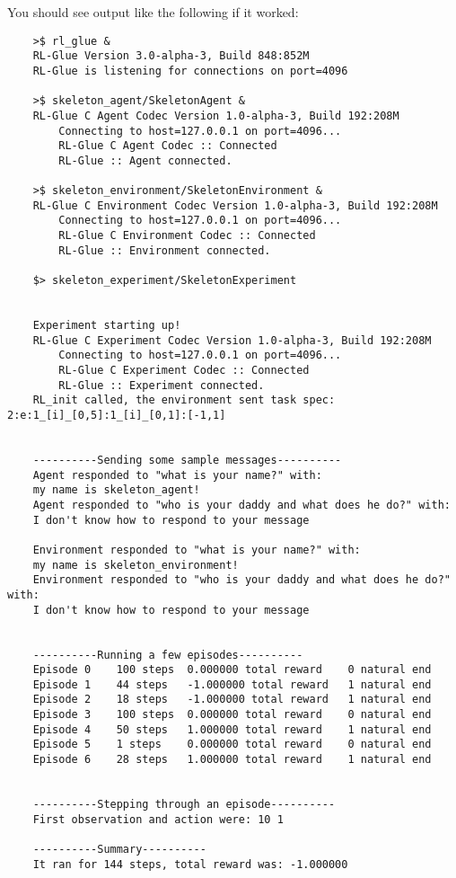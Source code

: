\documentclass[11pt]{article}
\begin{document}
You should see output like the following if it worked:
\begin{verbatim}
	>$ rl_glue &
	RL-Glue Version 3.0-alpha-3, Build 848:852M
	RL-Glue is listening for connections on port=4096

	>$ skeleton_agent/SkeletonAgent & 
	RL-Glue C Agent Codec Version 1.0-alpha-3, Build 192:208M
		Connecting to host=127.0.0.1 on port=4096...
		RL-Glue C Agent Codec :: Connected
		RL-Glue :: Agent connected.

	>$ skeleton_environment/SkeletonEnvironment & 
	RL-Glue C Environment Codec Version 1.0-alpha-3, Build 192:208M
		Connecting to host=127.0.0.1 on port=4096...
		RL-Glue C Environment Codec :: Connected
		RL-Glue :: Environment connected.

	$> skeleton_experiment/SkeletonExperiment


	Experiment starting up!
	RL-Glue C Experiment Codec Version 1.0-alpha-3, Build 192:208M
		Connecting to host=127.0.0.1 on port=4096...
		RL-Glue C Experiment Codec :: Connected
		RL-Glue :: Experiment connected.
	RL_init called, the environment sent task spec: 2:e:1_[i]_[0,5]:1_[i]_[0,1]:[-1,1]


	----------Sending some sample messages----------
	Agent responded to "what is your name?" with: 
	my name is skeleton_agent!
	Agent responded to "who is your daddy and what does he do?" with: 
	I don't know how to respond to your message

	Environment responded to "what is your name?" with: 
	my name is skeleton_environment!
	Environment responded to "who is your daddy and what does he do?" with: 
	I don't know how to respond to your message


	----------Running a few episodes----------
	Episode 0	 100 steps 	0.000000 total reward	 0 natural end 
	Episode 1	 44 steps 	-1.000000 total reward	 1 natural end 
	Episode 2	 18 steps 	-1.000000 total reward	 1 natural end 
	Episode 3	 100 steps 	0.000000 total reward	 0 natural end 
	Episode 4	 50 steps 	1.000000 total reward	 1 natural end 
	Episode 5	 1 steps 	0.000000 total reward	 0 natural end 
	Episode 6	 28 steps 	1.000000 total reward	 1 natural end 


	----------Stepping through an episode----------
	First observation and action were: 10 1

	----------Summary----------
	It ran for 144 steps, total reward was: -1.000000
	
\end{verbatim}
\end{document}
